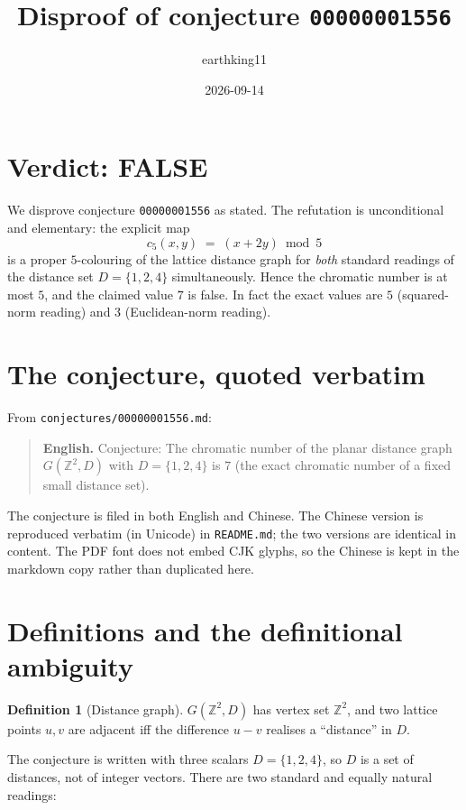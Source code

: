 \documentclass[11pt]{article}
\title{Disproof of conjecture \texttt{00000001556}}
\author{earthking11}
\date{2026-09-14}
\theoremstyle{definition}
\newtheorem{definition}[theorem]{Definition}
\theoremstyle{remark}
\newcommand{\Z}{\mathbb{Z}}
\begin{document}
\maketitle

\section*{Verdict: FALSE}

We disprove conjecture \texttt{00000001556} as stated. The refutation is
unconditional and elementary: the explicit map
\[
  c_5(x,y) \;=\; (x + 2y) \bmod 5
\]
is a proper $5$-colouring of the lattice distance graph for \emph{both} standard
readings of the distance set $D=\{1,2,4\}$ simultaneously. Hence the chromatic
number is at most $5$, and the claimed value $7$ is false. In fact the exact
values are $5$ (squared-norm reading) and $3$ (Euclidean-norm reading).

\section{The conjecture, quoted verbatim}

From \texttt{conjectures/00000001556.md}:

\begin{quote}
\textbf{English.} Conjecture: The chromatic number of the planar distance graph
$G(\Z^2, D)$ with $D = \{1, 2, 4\}$ is $7$ (the exact chromatic number of a
fixed small distance set).
\end{quote}

The conjecture is filed in both English and Chinese. The Chinese version is
reproduced verbatim (in Unicode) in \texttt{README.md}; the two versions are
identical in content. The PDF font does not embed CJK glyphs, so the Chinese is
kept in the markdown copy rather than duplicated here.

\section{Definitions and the definitional ambiguity}

\begin{definition}[Distance graph]
$G(\Z^2, D)$ has vertex set $\Z^2$, and two lattice points $u,v$ are adjacent
iff the difference $u-v$ realises a ``distance'' in $D$.
\end{definition}

The conjecture is written with three scalars $D=\{1,2,4\}$, so $D$ is a set of
distances, not of integer vectors. There are two standard and equally natural
readings:
\end{document}
